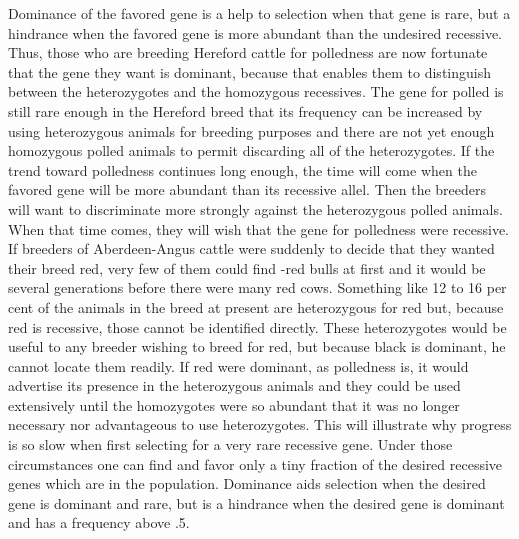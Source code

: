 Dominance of the favored gene is a help to selection when that gene
is rare, but a hindrance when the favored gene is more abundant than
the undesired recessive. Thus, those who are breeding Hereford cattle
for polledness are now fortunate that the gene they want is dominant,
because that enables them to distinguish between the heterozygotes and
the homozygous recessives. The gene for polled is still rare enough in
the Hereford breed that its frequency can be increased by using heterozygous
animals for breeding purposes and there are not yet enough
homozygous polled animals to permit discarding all of the heterozygotes.
If the trend toward polledness continues long enough, the time
will come when the favored gene will be more abundant than its recessive
allel. Then the breeders will want to discriminate more strongly
against the heterozygous polled animals. When that time comes, they
will wish that the gene for polledness were recessive. If breeders of
Aberdeen-Angus cattle were suddenly to decide that they wanted their
breed red, very few of them could find -red bulls at first and it would be
several generations before there were many red cows. Something like 12
to 16 per cent of the animals in the breed at present are heterozygous
for red but, because red is recessive, those cannot be identified directly.
These heterozygotes would be useful to any breeder wishing to breed
for red, but because black is dominant, he cannot locate them readily.
If red were dominant, as polledness is, it would advertise its presence in
the heterozygous animals and they could be used extensively until the
homozygotes were so abundant that it was no longer necessary nor
advantageous to use heterozygotes. This will illustrate why progress is
so slow when first selecting for a very rare recessive gene. Under those
circumstances one can find and favor only a tiny fraction of the desired
recessive genes which are in the population. Dominance aids selection
when the desired gene is dominant and rare, but is a hindrance when
the desired gene is dominant and has a frequency above .5.

